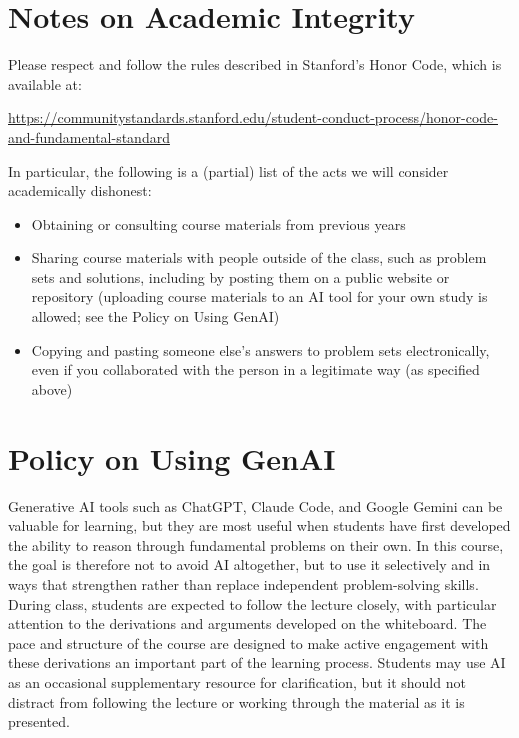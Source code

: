 \documentclass[PS]{syllabus}
\begin{document}
\begin{syllabus}
\section*{Notes on Academic Integrity}
Please respect and follow the rules described in Stanford's Honor Code, which is available at:
\begin{center}
\href{https://communitystandards.stanford.edu/student-conduct-process/honor-code-and-fundamental-standard}{https://communitystandards.stanford.edu/student-conduct-process/honor-code-and-fundamental-standard}
\end{center}
In particular, the following is a (partial) list of the acts we will consider academically dishonest:
\begin{itemize}
\item Obtaining or consulting course materials from previous years
\item Sharing course materials with people outside of the class, such as problem sets and solutions, including by posting them on a public website or repository (uploading course materials to an AI tool for your own study is allowed; see the Policy on Using GenAI)
\item Copying and pasting someone else's answers to problem sets electronically, even if you collaborated with the person in a legitimate way (as specified above)
\end{itemize}

\section*{Policy on Using GenAI}

Generative AI tools such as ChatGPT, Claude Code, and Google Gemini can be valuable for learning, but they are most useful when students have first developed the ability to reason through fundamental problems on their own. In this course, the goal is therefore not to avoid AI altogether, but to use it selectively and in ways that strengthen rather than replace independent problem-solving skills.\\

During class, students are expected to follow the lecture closely, with particular attention to the derivations and arguments developed on the whiteboard. The pace and structure of the course are designed to make active engagement with these derivations an important part of the learning process. Students may use AI as an occasional supplementary resource for clarification, but it should not distract from following the lecture or working through the material as it is presented.\\


\end{syllabus}
\end{document}
